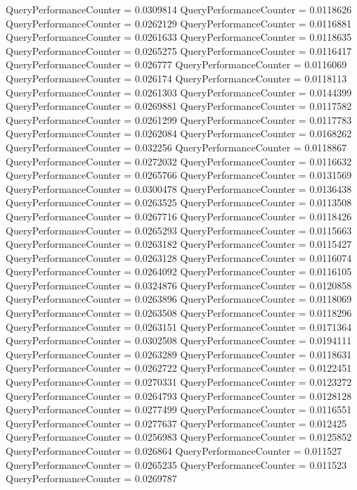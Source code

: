 \documentclass[9pt]{article}
\theoremstyle{plain}
\theoremstyle{definition}
\theoremstyle{remark}
\numberwithin{equation}{section}
\begin{document}
QueryPerformanceCounter  =  0.0309814
QueryPerformanceCounter  =  0.0118626
QueryPerformanceCounter  =  0.0262129
QueryPerformanceCounter  =  0.0116881
QueryPerformanceCounter  =  0.0261633
QueryPerformanceCounter  =  0.0118635
QueryPerformanceCounter  =  0.0265275
QueryPerformanceCounter  =  0.0116417
QueryPerformanceCounter  =  0.026777
QueryPerformanceCounter  =  0.0116069
QueryPerformanceCounter  =  0.026174
QueryPerformanceCounter  =  0.0118113
QueryPerformanceCounter  =  0.0261303
QueryPerformanceCounter  =  0.0144399
QueryPerformanceCounter  =  0.0269881
QueryPerformanceCounter  =  0.0117582
QueryPerformanceCounter  =  0.0261299
QueryPerformanceCounter  =  0.0117783
QueryPerformanceCounter  =  0.0262084
QueryPerformanceCounter  =  0.0168262
QueryPerformanceCounter  =  0.032256
QueryPerformanceCounter  =  0.0118867
QueryPerformanceCounter  =  0.0272032
QueryPerformanceCounter  =  0.0116632
QueryPerformanceCounter  =  0.0265766
QueryPerformanceCounter  =  0.0131569
QueryPerformanceCounter  =  0.0300478
QueryPerformanceCounter  =  0.0136438
QueryPerformanceCounter  =  0.0263525
QueryPerformanceCounter  =  0.0113508
QueryPerformanceCounter  =  0.0267716
QueryPerformanceCounter  =  0.0118426
QueryPerformanceCounter  =  0.0265293
QueryPerformanceCounter  =  0.0115663
QueryPerformanceCounter  =  0.0263182
QueryPerformanceCounter  =  0.0115427
QueryPerformanceCounter  =  0.0263128
QueryPerformanceCounter  =  0.0116074
QueryPerformanceCounter  =  0.0264092
QueryPerformanceCounter  =  0.0116105
QueryPerformanceCounter  =  0.0324876
QueryPerformanceCounter  =  0.0120858
QueryPerformanceCounter  =  0.0263896
QueryPerformanceCounter  =  0.0118069
QueryPerformanceCounter  =  0.0263508
QueryPerformanceCounter  =  0.0118296
QueryPerformanceCounter  =  0.0263151
QueryPerformanceCounter  =  0.0171364
QueryPerformanceCounter  =  0.0302508
QueryPerformanceCounter  =  0.0194111
QueryPerformanceCounter  =  0.0263289
QueryPerformanceCounter  =  0.0118631
QueryPerformanceCounter  =  0.0262722
QueryPerformanceCounter  =  0.0122451
QueryPerformanceCounter  =  0.0270331
QueryPerformanceCounter  =  0.0123272
QueryPerformanceCounter  =  0.0264793
QueryPerformanceCounter  =  0.0128128
QueryPerformanceCounter  =  0.0277499
QueryPerformanceCounter  =  0.0116551
QueryPerformanceCounter  =  0.0277637
QueryPerformanceCounter  =  0.012425
QueryPerformanceCounter  =  0.0256983
QueryPerformanceCounter  =  0.0125852
QueryPerformanceCounter  =  0.026864
QueryPerformanceCounter  =  0.011527
QueryPerformanceCounter  =  0.0265235
QueryPerformanceCounter  =  0.011523
QueryPerformanceCounter  =  0.0269787
\end{document}
